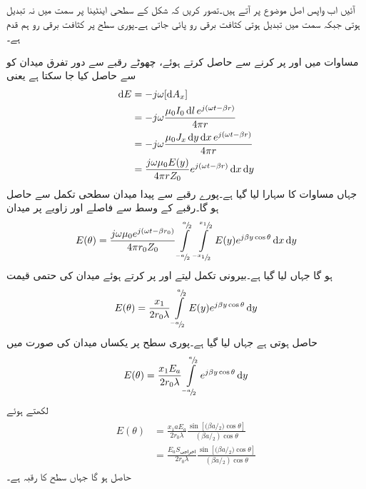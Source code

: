 آئیں اب واپس اصل موضوع پر آتے ہیں۔تصور کریں کہ شکل  کے سطحی اینٹینا پر  سمت میں نہ تبدیل ہوتی جبکہ  سمت میں تبدیل ہوتی کثافت برقی رو  پائی جاتی ہے۔پوری سطح پر کثافت برقی رو ہم قدم ہے۔

مساوات  میں  اور  پر کرنے  سے  حاصل کرتے ہوئے، چھوٹے رقبے   سے دور تفرق میدان کو  سے حاصل کیا جا سکتا ہے یعنی
\begin{gather}
\begin{aligned}
\dif E &=-j \omega [\dif A_x] \\
&=-j \omega \frac{\mu_0 I_0 \dif l \, e^{j(\omega t -\beta r)}}{4\pi r}  \\
&=-j \omega \frac{\mu_0 J_x \dif y \dif x \, e^{j(\omega t -\beta r)}}{4\pi r}  \\
&=\frac{j \omega \mu_0 E(y)}{4\pi r Z_0} e^{j(\omega t-\beta r)} \dif x \dif y
\end{aligned}
\end{gather}
جہاں مساوات  کا سہارا لیا گیا ہے۔پورے رقبے  سے پیدا میدان سطحی تکمل سے حاصل ہو گا۔رقبے کے وسط سے  فاصلے اور  زاویے پر میدان
\begin{align}
E(\theta)=\frac{j \omega \mu_0 e^{j(\omega t-\beta r_0)}}{4\pi r_0 Z_0} \int \limits_{^{-a}\!/\!_2}^{^a\!/\!_2} \int \limits_{^{-x_1}\!/\!_2}^{^{x_1}\!/\!_2} E(y) e^{j\beta y \cos \theta} \dif x \dif y
\end{align}
ہو گا جہاں  لیا گیا ہے۔بیرونی تکمل لیتے اور  پر کرتے ہوئے  میدان کی حتمی قیمت  
\begin{align}\label{مساوات_اینٹینا_فوریئر_تعلق_الف}
E(\theta)=\frac{x_1}{2 r_0 \lambda} \int \limits_{^{-a}\!/\!_2}^{^a\!/\!_2}  E(y) e^{j\beta y \cos \theta} \dif y
\end{align}
حاصل ہوتی ہے جہاں  لیا گیا ہے۔پوری سطح پر یکساں میدان  کی صورت میں
\begin{align}
E(\theta)=\frac{x_1 E_a}{2 r_0 \lambda} \int \limits_{^{-a}\!/\!_2}^{^a\!/\!_2}  e^{j\beta y \cos \theta} \dif y
\end{align}
لکھتے ہوئے
\begin{gather}
\begin{aligned}\label{مساوات_اینٹینا_سطحی_دور_میدان}
E(\theta)&=\frac{x_1 a E_a }{2 r_0 \lambda} \frac{\sin [{(\beta a}\!/\!_2)\cos \theta ]}{({\beta a}\!/\!_2)\cos \theta}\\
&=\frac{E_a S_{\text{اخراجی}}}{2 r_0 \lambda} \frac{\sin [{(\beta a}\!/\!_2)\cos \theta ]}{({\beta a}\!/\!_2)\cos \theta}
\end{aligned}
\end{gather}
حاصل ہو گا جہاں  سطح کا رقبہ ہے۔

